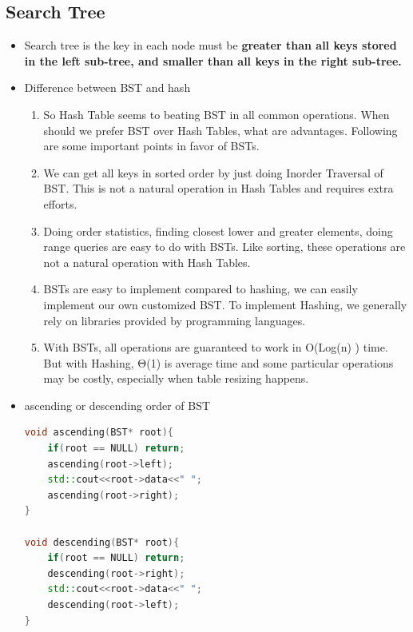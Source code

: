 \documentclass[a4paper,12pt,twoside]{book}
\begin{document}
\subsection{Search Tree}
\begin{itemize}
\item Search tree is the key in each node must be \textbf{greater than all keys stored in the left sub-tree, and smaller than all keys in the right sub-tree.} 

\item Difference between BST and hash
\begin{enumerate}
\item So Hash Table seems to beating BST in all common operations. When should we prefer BST over Hash Tables, what are advantages. Following are some important points in favor of BSTs.

\item We can get all keys in sorted order by just doing Inorder Traversal of BST. This is not a natural operation in Hash Tables and requires extra efforts.

\item Doing order statistics, finding closest lower and greater elements, doing range queries are easy to do with BSTs. Like sorting, these operations are not a natural operation with Hash Tables.

\item BSTs are easy to implement compared to hashing, we can easily implement our own customized BST. To implement Hashing, we generally rely on libraries provided by programming languages.

\item With BSTs, all operations are guaranteed to work in O(Log(n) ) time. But with Hashing, Θ(1) is average time and some particular operations may be costly, especially when table resizing happens.
\end{enumerate}

\item ascending or descending order of BST
\begin{lstlisting}[frame=single, language=c++]
void ascending(BST* root){
    if(root == NULL) return;
    ascending(root->left);
    std::cout<<root->data<<" ";
    ascending(root->right);
}
 
void descending(BST* root){
    if(root == NULL) return;
    descending(root->right);
    std::cout<<root->data<<" ";
    descending(root->left);
}
\end{lstlisting}

\end{itemize}
\end{document}
